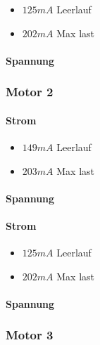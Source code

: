 \documentclass{article}
\begin{document}
\begin{itemize}

\item $125 mA$ Leerlauf

\item $202 mA$ Max last

\end{itemize}

\paragraph{Spannung}

\subsubsection{Motor 2}

\paragraph{Strom}

\begin{itemize}

\item $149 mA$ Leerlauf

\item $203 mA$ Max last

\end{itemize}

\paragraph{Spannung}


\paragraph{Strom}

\begin{itemize}

\item $125 mA$ Leerlauf

\item $202 mA$ Max last

\end{itemize}

\paragraph{Spannung}


\subsubsection{Motor 3}
\end{document}
